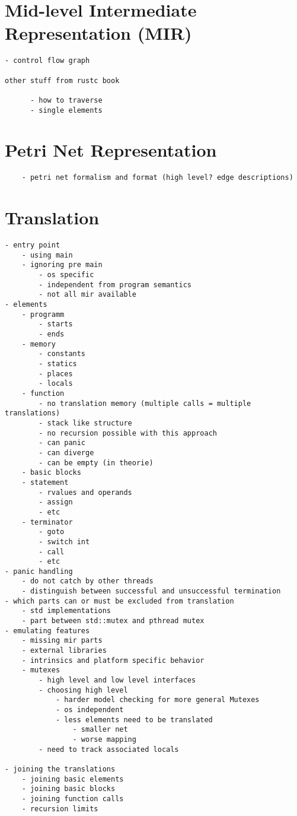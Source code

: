 \section{Mid-level Intermediate Representation (MIR)}
\label{app_mir}
\begin{verbatim}
- control flow graph

other stuff from rustc book

      - how to traverse
      - single elements
\end{verbatim}

\section{Petri Net Representation}
\label{app_petri}
\begin{verbatim}
    - petri net formalism and format (high level? edge descriptions)
\end{verbatim}

\section{Translation}
\label{app_trans}
\begin{verbatim}
- entry point
    - using main
    - ignoring pre main
        - os specific
        - independent from program semantics
        - not all mir available
- elements
    - programm
        - starts
        - ends
    - memory
        - constants
        - statics
        - places
        - locals
    - function
        - no translation memory (multiple calls = multiple translations)
        - stack like structure
        - no recursion possible with this approach
        - can panic
        - can diverge
        - can be empty (in theorie)
    - basic blocks
    - statement
        - rvalues and operands
        - assign
        - etc
    - terminator
        - goto
        - switch int
        - call
        - etc
- panic handling
    - do not catch by other threads
    - distinguish between successful and unsuccessful termination
- which parts can or must be excluded from translation
    - std implementations
    - part between std::mutex and pthread mutex
- emulating features
    - missing mir parts
    - external libraries
    - intrinsics and platform specific behavior
    - mutexes
        - high level and low level interfaces
        - choosing high level
            - harder model checking for more general Mutexes
            - os independent
            - less elements need to be translated
                - smaller net
                - worse mapping
        - need to track associated locals

- joining the translations
    - joining basic elements
    - joining basic blocks
    - joining function calls
    - recursion limits
\end{verbatim}


